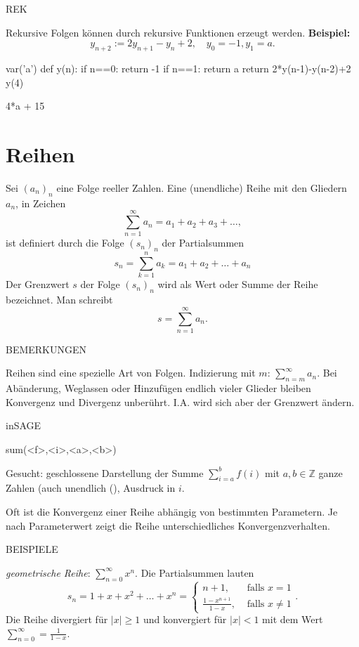 \documentclass[fontsize=12pt,paper=a4,twoside,bibtotoc,idxtotoc,
liststotoc,pagesize,BCOR1.2cm,DIV15,chapterprefix,pagesize=pdftex]{scrbook}
\theoremstyle{plain}
\theoremstyle{definition}
\theoremstyle{remark}
\begin{document}
REK

Rekursive Folgen können durch rekursive Funktionen erzeugt werden.
\textbf{Beispiel:}
\[ y_{n+2}:=2y_{n+1}-y_n+2, \quad y_0=-1, y_1=a. \]
\begin{sagein}
var('a')
def y(n):
   if n==0:
       return -1
   if n==1:
       return a
   return 2*y(n-1)-y(n-2)+2
y(4)
\end{sagein}
\begin{sage}
4*a + 15
\end{sage}

\section{Reihen}
Sei $(a_n)_n$ eine Folge reeller Zahlen. Eine {\color{red} (unendliche)
Reihe} mit den {\color{red} Gliedern} $a_n$, in Zeichen
\[ \sum_{n=1}^\infty a_n =a_1 + a_2 + a_3 + \dots, \]
ist definiert durch die Folge $(s_n)_n$ der {\color{red} Partialsummen}\\
\[
s_n=\sum_{k=1}^n a_k = a_1+a_2+ \dots +a_n 
\]
Der Grenzwert $s$ der Folge $(s_n)_n$ wird als {\color{red} Wert} oder 
{\color{red} Summe} der Reihe bezeichnet. Man schreibt
\[s= \sum_{n=1}^\infty a_n.\] 

BEMERKUNGEN


  Reihen sind eine spezielle Art von Folgen.
 Indizierung mit $m$: $\sum_{n=m}^\infty a_n$.
 Bei Abänderung, Weglassen oder Hinzufügen endlich vieler Glieder
bleiben Konvergenz und Divergenz unberührt. I.A. wird sich aber der
Grenzwert ändern.


inSAGE

\begin{sagein}
sum(<f>,<i>,<a>,<b>) 
\end{sagein}
Gesucht: geschlossene Darstellung der Summe $\sum_{i=a}^b f(i)$ mit $a,b \in \mathbb{Z}$ ganze
Zahlen (auch unendlich (),  Ausdruck in $i$.

 Oft ist die Konvergenz einer Reihe abhängig von bestimmten Parametern. Je nach Parameterwert zeigt die Reihe
unterschiedliches Konvergenzverhalten.


BEISPIELE


 \emph{geometrische Reihe}: $\sum_{n=0}^\infty x^n$. Die
Partialsummen lauten
\[ s_n=1+x+x^2+\ldots + x^n = \left \{ \begin{array}{ll}
n+1, & \mbox{ falls } x=1\\
\frac{1-x^{n+1}}{1-x}, & \mbox{ falls } x \neq 1 
\end{array} \right. .\]
Die Reihe divergiert für $|x|\geq1$ und konvergiert für $|x|<1$ mit
dem Wert $\sum_{n=0}^\infty = \frac{1}{1-x}$.
\end{document}
